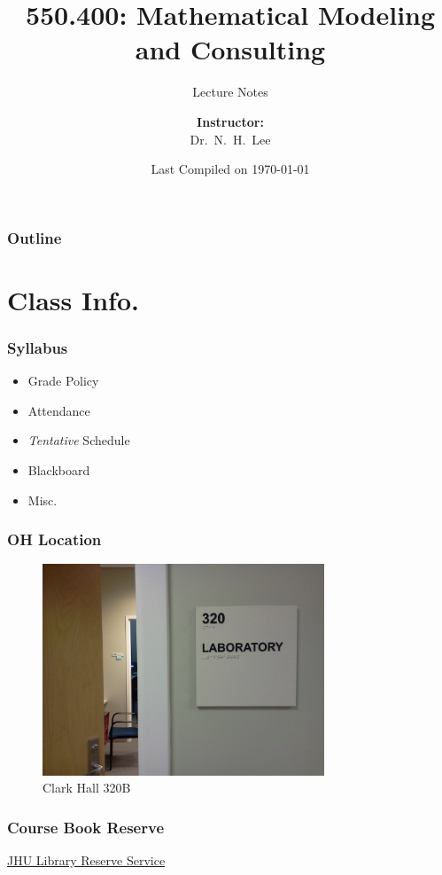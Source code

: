 \documentclass[hyperref={colorlinks=false},compress,handout,10pt]{beamer}
\title{{\color{blue} \LARGE 550.400: Mathematical Modeling and Consulting\newline} }
\subtitle{{\color{red} \large Lecture Notes} }
\author{ 
    {\bf{Instructor:}} \\ 
Dr.~N.~H.~Lee \\ 
    \vspace{5pt}
}
\institute{JHU AMS 2012 FALL}
\date{\mygreen Last Compiled on \today}
\let\olditem\item
\renewcommand{\item}{\setlength{\itemsep}{0.5\baselineskip}\olditem}
\begin{document}
\begin{frame}[plain]
  \titlepage
\end{frame}



\begin{frame}
  \frametitle{Outline}
  \tableofcontents
\end{frame}


\section{Class Info.}

\begin{frame}
    \frametitle{Syllabus}
    \begin{itemize}
        \item Grade Policy
        \item Attendance
        \item \emph{Tentative} Schedule
        \item Blackboard
        \item Misc.
    \end{itemize}
\end{frame}

\begin{frame}
    \frametitle{OH Location}
    \begin{figure}
        \caption{Clark Hall 320B}
        \begin{center}
            \includegraphics[width=0.75\textwidth]{images/Clark320B.jpg}
        \end{center}
        \label{fig:ClarkHall320B}
    \end{figure}
\end{frame}

\begin{frame}[fragile]
    \frametitle{Course Book Reserve}
    \vskip0.5in
    \begin{center}
        \href{https://catalyst.library.jhu.edu/reserves/13812}{JHU Library Reserve Service}
    \end{center}
\end{frame}
\end{document}
